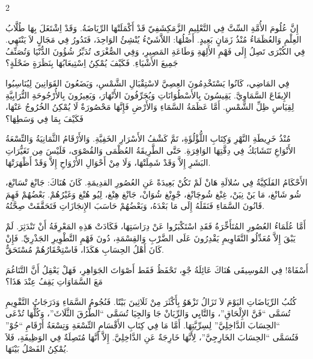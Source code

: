 \documentclass[11pt,a4paper]{article}
\newcommand{\ar}[1]{\arabicfont\beginR #1\endR}
\providecommand{\enquote}[1]{``#1''}
\newenvironment{bilingual}{%
  \begin{paracol}{2}
}{%
  \end{paracol}
}
\begin{document}
\begin{bilingual}
\begin{rightcolumn*}
\ar{إِنَّ عُلُومَ الأُمَّةِ السِّتَّ فِي التَّعْلِيمِ الزَّمَكِشَفِيّ قَدْ أَكْمَلَتْهَا الرِّيَاضَةُ. وَقَدْ اِشْتَغَلَ بِهَا طُلَّابُ العِلْمِ وَالعُظَمَاءُ مُنْذُ زَمَانٍ بَعِيدٍ. أَصْلُهَا: اللاَّشَيْءُ يُنْشِئُ الوَاحِدَ، فَتَدُورُ فِي مَجَالٍ لاَ يَنْتَهِي. فِي الكُبْرَى تَصِلُ إِلَى فَهْمِ الأَلِهَةِ وَطَاعَةِ المَصِيرِ، وَفِي الصُّغْرَى تُدَبِّرُ شُؤُونَ الدُّنْيَا وَتُصَنِّفُ جَمِيعَ الأَشْيَاءِ. فَكَيْفَ يُمْكِنُ اِسْتِيعَابُهَا بِنَظَرَةٍ ضَحْلَةٍ؟}

\ar{فِي المَاضِي، كَانُوا يَسْتَخْدِمُونَ العِصِيَّ لاسْتِقْبَالِ الشَّمْسِ، وَيَضَعُونَ القَوَانِينَ لِيُنَاسِبُوا الإِيقَاعَ السَّمَاوِيَّ. يَقِيسُونَ بِالأَسْطُوَانَاتِ وَيُجَرِّفُونَ الأَنْهَارَ، وَيَعِيرُونَ بِالأُرْجُوحَةِ التُّرَابِيَّةِ لِقِيَاسِ ظِلِّ الشَّمْسِ. أَمَّا عَظَمَةُ السَّمَاءِ وَالأَرْضِ فَإِنَّهَا مَحْصُورَةٌ لَا يُمْكِنُ الخُرُوجُ عَنْهَا، فَكَيْفَ بِمَا فِي وَسَطِهَا؟}

\ar{مُنْذُ خَرِيطَةِ النَّهْرِ وَكِتَابِ اللُّؤْلُؤَةِ، تَمَّ كَشْفُ الأَسْرَارِ الخَفِيَّةِ. وَالأَرْقَامُ الثَّمَانِيَةُ وَالتِّسْعَةُ الأَنْوَاعِ تَتَشَابَكُ فِي دِقَّتِهَا الوَافِرَةِ. حَتَّى الطَّرِيقَةُ العُظْمَى وَالقُصْوَى، فَلَيْسَ مِن تَغَيُّرَاتِ البَشَرِ إِلاَّ وَقَدْ شَمِلَتْهَا، وَلَا مِنْ أَحْوَالِ الأَرْوَاحِ إِلاَّ وَقَدْ أَظْهَرَتْهَا.}

\ar{الأَحْكَامُ الفَلَكِيَّةُ فِي سُلالَةِ هَانْ لَمْ تَكُنْ بَعِيدَةً عَنِ العُصُورِ القدِيمَةِ. كَانَ هُنَاكَ: جَانْغ تْسَانْغ، شُو شَانْغ، مَا يَنْ نِيَنْ، غِنْغ شُوچَانْغ، جْوِنْغ شُوَانْ، جَانْغ هِنْغ، لِيُو هُنْغ وَغَيْرُهُمْ. بَعْضُهُمْ فَهِمَ قَانُونَ السَّمَاءِ فَنَقَلَهُ إِلَى مَا بَعْدَهُ، وَبَعْضُهُمْ حَاسَبَ الإِنجَازَاتِ فَتَحَقَّقَتْ صِحَّتُهُ.}

\ar{أَمَّا عُلَمَاءُ العُصُورِ المُتَأَخِّرَةُ فَقَدِ اسْتَكْبَرُوا عَنْ دِرَاسَتِهَا، فَكَادَتْ هَذِهِ المَعْرِفَةُ أَنْ تَنْدَثِرَ. لَمْ يَبْقَ إِلاَّ مُعَدِّلُو التَّقَاوِيمِ يَقْدِرُونَ عَلَى الضَّرْبِ وَالقِسْمَةِ، دُونَ فَهْمِ التَّطْوِيرِ الجَذْرِيِّ. فَإِنْ كَانَ أَهْلُ الحِسَابِ هَكَذَا، فَاسْتِحْقَارُهُمْ مُسْتَحَقٌّ.}

\ar{أَسْفَاهْ! فِي المُوسِيقَى هُنَاكَ عَائِلَةُ جْوِ، تَحْفَظُ فَقَط أَصْوَاتَ الجَوَاهِرِ، فَهَلْ يَعْقِلُ أَنَّ التَّنَاغُمَ مَعَ السَّمَاوَاتِ يَقِفُ عِنْدَ هَذَا؟}

\ar{كُتُبُ الرِّيَاضَاتِ اليَوْمَ لاَ تَزَالُ تَزْهَوُ بِأَكْثَرَ مِنْ ثَلَاثِينَ بَيْتًا. فَنُجُومُ السَّمَاءِ وَدَرَجَاتُ التَّقْوِيمِ تُسَمَّى \enquote{فَنَّ الإِلْحَاقِ}، وَالتَّايِي وَالرِّيَانْ جَا وَالجِيَا تُسَمَّى \enquote{الطُّرُقَ الثَّلَاثَ}، وَكُلُّهَا تُدْعَى \enquote{الحِسَابَ الدَّاخِلِيَّ} لِسِرِّيَّتِهَا. أَمَّا مَا فِي كِتَابِ الأَقْسَامِ التِّسْعَةِ وَتِسْعَةُ أَرْقَامِ \enquote{جُوْ} فَتُسَمَّى \enquote{الحِسَابَ الخَارِجِيَّ}، لِأَنَّهَا خَارِجَةٌ عَنِ الدَّاخِلِيَّ. إِلاَّ أَنَّهَا مُتَصِلَةٌ فِي الوَظِيفَةِ، فَلاَ يُمْكِنُ الفَصْلُ بَيْنَهَا.}


\end{rightcolumn*}
\end{bilingual}
\end{document}
